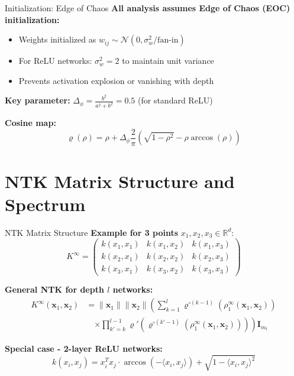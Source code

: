 \documentclass{beamer}
\begin{document}
\begin{frame}{Initialization: Edge of Chaos}
\textbf{All analysis assumes Edge of Chaos (EOC) initialization:}

\begin{itemize}
\item Weights initialized as $w_{ij} \sim \mathcal{N}(0, \sigma_w^2/\text{fan-in})$
\item For ReLU networks: $\sigma_w^2 = 2$ to maintain unit variance
\item Prevents activation explosion or vanishing with depth
\end{itemize}

\textbf{Key parameter:} $\Delta_\phi = \frac{b^2}{a^2+b^2} = 0.5$ (for standard ReLU)

\textbf{Cosine map:}
\[ \varrho(\rho) = \rho + \Delta_\phi \frac{2}{\pi}\left( \sqrt{1-\rho^2} - \rho \arccos(\rho) \right) \]
\end{frame}

\section{NTK Matrix Structure and Spectrum}

\begin{frame}{NTK Matrix Structure}
\textbf{Example for 3 points} $x_1, x_2, x_3 \in \mathbb{R}^d$:
\[
K^{\infty} = \begin{pmatrix} 
k(x_1,x_1) & k(x_1,x_2) & k(x_1,x_3) \\
k(x_2,x_1) & k(x_2,x_2) & k(x_2,x_3) \\
k(x_3,x_1) & k(x_3,x_2) & k(x_3,x_3)
\end{pmatrix}
\]

\textbf{General NTK for depth $l$ networks:}
\begin{align*}
K^{\infty}(\mathbf{x}_1, \mathbf{x}_2) &= \|\mathbf{x}_1\| \|\mathbf{x}_2\| \left( \sum_{k=1}^l \varrho^{\circ (k-1)}\left(\rho_1^{\infty}(\mathbf{x}_1, \mathbf{x}_2)\right) \right. \\
&\quad \left. \times \prod_{k'=k}^{l-1} \varrho'\left(\varrho^{\circ (k'-1)}\left(\rho_1^{\infty}(\mathbf{x}_1, \mathbf{x}_2)\right)\right) \right) \mathbf{I}_{m_l}
\end{align*}

\textbf{Special case - 2-layer ReLU networks:}
\[
k(x_i,x_j) = x_i^T x_j \cdot \arccos(-\langle x_i,x_j \rangle) + \sqrt{1-\langle x_i,x_j \rangle^2}
\]
\end{frame}
\end{document}
